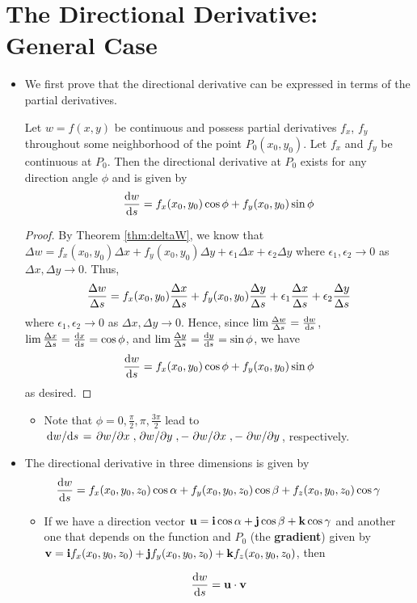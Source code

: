 \documentclass[../main.tex]{subfiles}
\begin{document}
\section{The Directional Derivative: General Case}
\begin{itemize}
    \item {}We first prove that the directional derivative can be expressed in terms of the partial derivatives.
    \begin{thm}
        Let $w=f(x,y)$ be continuous and possess partial derivatives $f_x$, $f_y$ throughout some neighborhood of the point $P_0(x_0,y_0)$. Let $f_x$ and $f_y$ be continuous at $P_0$. Then the directional derivative at $P_0$ exists for any direction angle $\phi$ and is given by
        \begin{equation*}
            \dv{w}{s} = f_x(x_0,y_0)\cos\phi+f_y(x_0,y_0)\sin\phi
        \end{equation*}
        \begin{proof}
            By Theorem \ref{thm:deltaW}, we know that $\Delta w=f_x(x_0,y_0)\Delta x+f_y(x_0,y_0)\Delta y+\epsilon_1\Delta x+\epsilon_2\Delta y$ where $\epsilon_1,\epsilon_2\to 0$ as $\Delta x,\Delta y\to 0$. Thus,
            \begin{equation*}
                \frac{\Delta w}{\Delta s} = f_x(x_0,y_0)\frac{\Delta x}{\Delta s}+f_y(x_0,y_0)\frac{\Delta y}{\Delta s}+\epsilon_1\frac{\Delta x}{\Delta s}+\epsilon_2\frac{\Delta y}{\Delta s}
            \end{equation*}
            where $\epsilon_1,\epsilon_2\to 0$ as $\Delta x,\Delta y\to 0$. Hence, since $\lim\frac{\Delta w}{\Delta s}=\dv{w}{s}$, $\lim\frac{\Delta x}{\Delta s}=\dv{x}{s}=\cos\phi$, and $\lim\frac{\Delta y}{\Delta s}=\dv{y}{s}=\sin\phi$, we have
            \begin{equation*}
                \dv{w}{s} = f_x(x_0,y_0)\cos\phi+f_y(x_0,y_0)\sin\phi
            \end{equation*}
            as desired.
        \end{proof}
    \end{thm}
    \begin{itemize}
        \item Note that $\phi=0,\frac{\pi}{2},\pi,\frac{3\pi}{2}$ lead to $\dv*{w}{s}=\pdv*{w}{x},\pdv*{w}{y},-\pdv*{w}{x},-\pdv*{w}{y}$, respectively.
    \end{itemize}
    \item The directional derivative in three dimensions is given by
    \begin{equation*}
        \dv{w}{s} = f_x(x_0,y_0,z_0)\cos\alpha+f_y(x_0,y_0,z_0)\cos\beta+f_z(x_0,y_0,z_0)\cos\gamma
    \end{equation*}
    \begin{itemize}
        \item If we have a direction vector $\vb{u}=\vb{i}\cos\alpha+\vb{j}\cos\beta+\vb{k}\cos\gamma$ and another one that depends on the function and $P_0$ (the \textbf{gradient}) given by $\vb{v}=\vb{i}f_x(x_0,y_0,z_0)+\vb{j}f_y(x_0,y_0,z_0)+\vb{k}f_z(x_0,y_0,z_0)$, then
    \end{itemize}
    \begin{equation*}
        \dv{w}{s} = \vb{u}\cdot\vb{v}
    \end{equation*}
\end{itemize}
\end{document}
